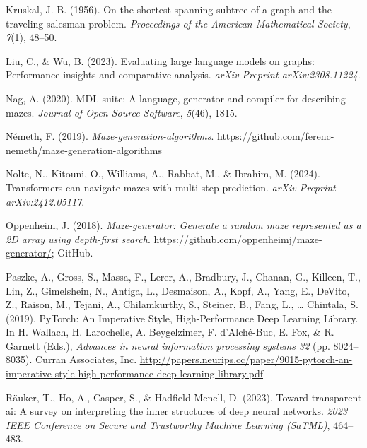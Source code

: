 \documentclass[10pt,a4paper,onecolumn]{article}
\newlength{\cslhangindent}
\newenvironment{CSLReferences}[2] %
 {\begin{list}{}{%
  \setlength{\itemindent}{0pt}
  \setlength{\leftmargin}{0pt}
  \setlength{\parsep}{0pt}
  \ifodd #1
   \setlength{\leftmargin}{\cslhangindent}
   \setlength{\itemindent}{-1\cslhangindent}
  \fi
  \setlength{\itemsep}{#2\baselineskip}}}
 {\end{list}}
\begin{document}
\begin{CSLReferences}{1}{0.5}
\leavevmode{}%
Kruskal, J. B. (1956). On the shortest spanning subtree of a graph and
the traveling salesman problem. \emph{Proceedings of the American
Mathematical Society}, \emph{7}(1), 48--50.

\leavevmode{}%
Liu, C., \& Wu, B. (2023). Evaluating large language models on graphs:
Performance insights and comparative analysis. \emph{arXiv Preprint
arXiv:2308.11224}.

\leavevmode{}%
Nag, A. (2020). MDL suite: A language, generator and compiler for
describing mazes. \emph{Journal of Open Source Software}, \emph{5}(46),
1815.

\leavevmode{}%
Németh, F. (2019). \emph{Maze-generation-algorithms}.
\url{https://github.com/ferenc-nemeth/maze-generation-algorithms}

\leavevmode{}%
Nolte, N., Kitouni, O., Williams, A., Rabbat, M., \& Ibrahim, M. (2024).
Transformers can navigate mazes with multi-step prediction. \emph{arXiv
Preprint arXiv:2412.05117}.

\leavevmode{}%
Oppenheim, J. (2018). \emph{Maze-generator: Generate a random maze
represented as a 2D array using depth-first search}.
\url{https://github.com/oppenheimj/maze-generator/}; GitHub.

\leavevmode{}%
Paszke, A., Gross, S., Massa, F., Lerer, A., Bradbury, J., Chanan, G.,
Killeen, T., Lin, Z., Gimelshein, N., Antiga, L., Desmaison, A., Kopf,
A., Yang, E., DeVito, Z., Raison, M., Tejani, A., Chilamkurthy, S.,
Steiner, B., Fang, L., \ldots{} Chintala, S. (2019). {PyTorch: An
Imperative Style, High-Performance Deep Learning Library}. In H.
Wallach, H. Larochelle, A. Beygelzimer, F. d'Alché-Buc, E. Fox, \& R.
Garnett (Eds.), \emph{Advances in neural information processing systems
32} (pp. 8024--8035). Curran Associates, Inc.
\url{http://papers.neurips.cc/paper/9015-pytorch-an-imperative-style-high-performance-deep-learning-library.pdf}

\leavevmode{}%
Räuker, T., Ho, A., Casper, S., \& Hadfield-Menell, D. (2023). Toward
transparent ai: A survey on interpreting the inner structures of deep
neural networks. \emph{2023 IEEE Conference on Secure and Trustworthy
Machine Learning (SaTML)}, 464--483.


\end{CSLReferences}
\end{document}

